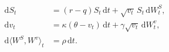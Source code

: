 \documentclass{equation-sheet}
\begin{document}
\begin{equation*}
\begin{aligned}
\mathrm{d}S_t
  &= (r-q)S_t\,\mathrm{d}t
     + \sqrt{v_t}\,S_t\,\mathrm{d}W_t^{S}, \\[0.55em]
\mathrm{d}v_t
  &= \kappa(\theta-v_t)\,\mathrm{d}t
     + \gamma\sqrt{v_t}\,\mathrm{d}W_t^{v}, \\[0.55em]
\mathrm{d}\langle W^{S},W^{v}\rangle_t
  &= \rho\,\mathrm{d}t.
\end{aligned}
\end{equation*}
\end{document}
